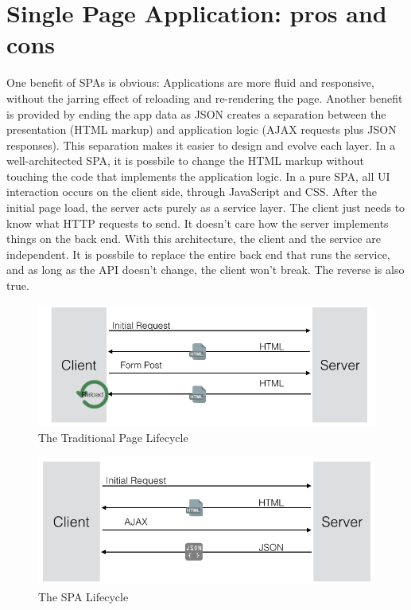 \section{Single Page Application: pros and cons}
\label{sec:ARC_overview}

One benefit of SPAs is obvious: Applications are more fluid and responsive, without the jarring effect of reloading and re-rendering the page.
Another benefit is provided by ending the app data as JSON creates a separation between the presentation (HTML markup) and application logic (AJAX requests plus JSON responses).
This separation makes it easier to design and evolve each layer. In a well-architected SPA, it is possbile to change the HTML markup without touching the code that implements the application logic.
In a pure SPA, all UI interaction occurs on the client side, through JavaScript and CSS. After the initial page load, the server acts purely as a service layer. The client just needs to know what HTTP requests to send. It doesn’t care how the server implements things on the back end.
With this architecture, the client and the service are independent. It is possbile to replace the entire back end that runs the service, and as long as the API doesn’t change, the client won’t break. The reverse is also true.

\begin {figure}[h]
\graphicspath{{images/chapter_arc/}}
\includegraphics[width=\textwidth]{trad_life}
\caption{The Traditional Page Lifecycle}
\end {figure}


\begin {figure}[h]
\graphicspath{{images/chapter_arc/}}
\includegraphics[width=\textwidth]{spa_life}
\caption{The SPA Lifecycle}
\end {figure}



